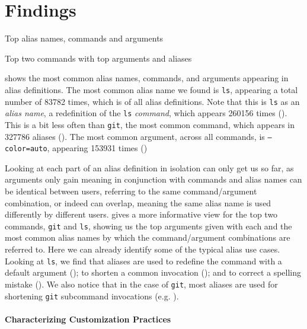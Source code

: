 \section{Findings}

\begin{table}[t]
    \caption{Top alias names, commands and arguments}
    \label{tab:top-summary}
    
\end{table}

\begin{table}
    \caption{Top two commands with top arguments and aliases}
    \label{tab:command-summary}
    
\end{table}

 shows the most common alias names, commands, and arguments appearing in alias definitions.
The most common alias name we found is \texttt{ls}, appearing a total number of \num{83782} times, which is  of all alias definitions.
Note that this is \texttt{ls} as an \emph{alias name}, a redefinition of the \texttt{ls} \emph{command}, which appears \num{260156} times ().
This is a bit less often than \texttt{git}, the most common command, which appears in \num{327786} aliases ().
The most common argument, across all commands, is \texttt{--color=auto}, appearing \num{153931} times ()

Looking at each part of an alias definition in isolation can only get us so far, as arguments only gain meaning in conjunction with commands and alias names can be identical between users, referring to the same command/argument combination, or indeed can overlap, meaning the same alias name is used differently by different users.
 gives a more informative view for the top two commands, \texttt{git} and \texttt{ls}, showing us the top arguments given with each and the most common alias names by which the command/argument combinations are referred to.
Here we can already identify some of the typical alias use cases.
Looking at \texttt{ls}, we find that aliases are used
to redefine the command with a default argument ();
to shorten a common invocation ();
and to correct a spelling mistake ().
We also notice that in the case of \texttt{git}, most aliases are used for shortening \texttt{git} subcommand invocations (e.g. ).

\paragraph{\bf Characterizing Customization Practices}

